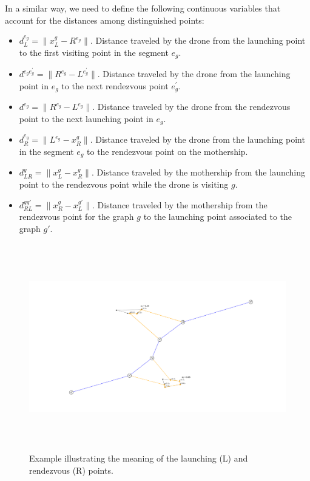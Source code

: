 \noindent
In a similar way, we need to define the following continuous variables that account for the distances among distinguished points:
\begin{itemize}
    \item $d_L^{e_g} = \|x_L^g - R^{e_g}\|$. Distance traveled by the drone from the launching point to the first visiting point in the segment $e_g$.
    \item $d^{e_ge^\prime_g} = \|R^{e_g} - L^{e^\prime_g}\|$. Distance traveled by the drone from the launching point in $e_g$ to the next rendezvous point $e^\prime_g$.
    \item $d^{e_g} = \|R^{e_g} - L^{e_g}\|$. Distance traveled by the drone from the rendezvous point  to the next launching point in $e_g$.
    \item $d_R^{e_g} = \|L^{e_g} - x_R^g\|$. Distance traveled by the drone from the launching point in the segment $e_g$ to the rendezvous point on the mothership.
    \item $d_{LR}^g = \|x_L^g - x_R^g\|$. Distance traveled by the mothership from the launching point to the rendezvous point while the drone is visiting $g$.
    \item $d_{RL}^{gg'} = \|x_R^g - x_L^{g'}\|$. Distance traveled by the mothership from the rendezvous point for the graph $g$ to the launching point associated to the graph $g'$.
\end{itemize}

\begin{figure}[h]
\centering
\includegraphics[height=9cm,width=\textwidth]{AMDRPG2.png}
\caption{Example illustrating the meaning of the launching  (L) and rendezvous (R)  points. \label{fig:illustrative}}
\end{figure}

